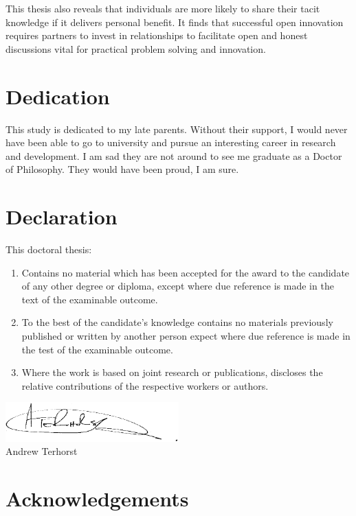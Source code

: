 \documentclass[12pt,table,xcdraw]{book}
\renewcommand{\today}{\the\day \ \monthname \ \the\year}
\begin{document}
This thesis also reveals that individuals are more likely to share their tacit knowledge if it delivers personal benefit. It finds that successful open innovation requires partners to invest in relationships to facilitate open and honest discussions vital for practical problem solving and innovation.

\chapter*{Dedication}

This study is dedicated to my late parents. Without their support, I would never have been able to go to university and pursue an interesting career in research and development. I am sad they are not around to see me graduate as a Doctor of Philosophy. They would have been proud, I am sure.

\chapter*{Declaration}

This doctoral thesis:

\begin{enumerate}
    \item Contains no material which has been accepted for the award to the candidate of any other degree or diploma, except where due reference is made in the text of the examinable outcome.
    \item To the best of the candidate’s knowledge contains no materials previously published or written by another person expect where due reference is made in the test of the examinable outcome.
    \item Where the work is based on joint research or publications, discloses the relative contributions of the respective workers or authors.
\end{enumerate} \bigskip

\includegraphics[width = 0.5\textwidth]{Images/Signature.png}\\
Andrew Terhorst\\
\shortdate{\today}

\chapter*{Acknowledgements}
\end{document}

